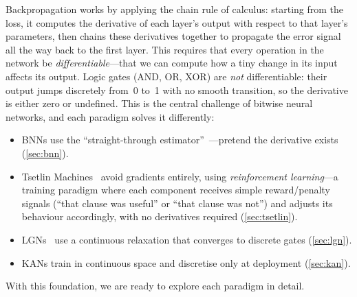 \begin{engineernote}
Backpropagation works by applying the chain rule of calculus: starting
from the loss, it computes the derivative of each layer's output with
respect to that layer's parameters, then chains these derivatives
together to propagate the error signal all the way back to the first
layer. This requires that every operation in the network be
\emph{differentiable}---that we can compute how a tiny change in its
input affects its output. Logic gates (AND, OR, XOR) are \emph{not}
differentiable: their output jumps discretely from~0 to~1 with no
smooth transition, so the derivative is either zero or undefined. This
is the central challenge of bitwise neural networks, and each paradigm
solves it differently:
\begin{itemize}[leftmargin=1em]
  \item BNNs use the ``straight-through estimator''~\cite{bengio2013ste}---pretend the
    derivative exists (\cref{sec:bnn}).
  \item Tsetlin Machines~\cite{granmo2018tsetlin} avoid gradients entirely, using
    \emph{reinforcement learning}---a training paradigm where each
    component receives simple reward/penalty signals (``that clause
    was useful'' or ``that clause was not'') and adjusts its behaviour
    accordingly, with no derivatives required (\cref{sec:tsetlin}).
  \item LGNs~\cite{petersen2022difflogic} use a continuous relaxation that converges to discrete
    gates (\cref{sec:lgn}).
  \item KANs train in continuous space and discretise only at
    deployment (\cref{sec:kan}).
\end{itemize}
\end{engineernote}

With this foundation, we are ready to explore each paradigm in detail.
